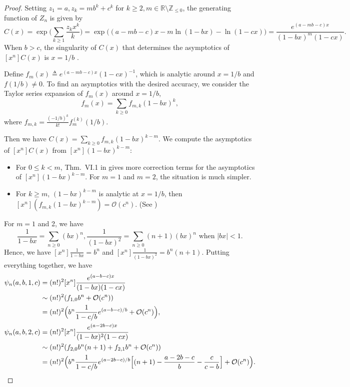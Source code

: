 \documentclass[conference]{IEEEtran}
\theoremstyle{plain}
\theoremstyle{definition}
\providecommand{\Z}{\mathbb {Z}}
\providecommand{\R}{\mathbb {R}}
\newcommand{\defeq}{\triangleq}
\begin{document}
 \begin{proof}
  Setting $z_1=a, z_k=mb^k+c^k$ for $k\geq 2, m\in \R\setminus\Z_{\leq 0} $, the generating function of $Z_n$ is given by
  \[
   C(x)=\exp\Biggl(\sum_{k\geq 1}\frac{z_kx^k}{k}\Biggr)
   =\exp\bigl((a-mb-c)x-m\ln(1-bx)-\ln(1-cx)\bigr)
   =\frac{e^{(a-mb-c)x}}{(1-bx)^m(1-cx)}.
  \]
  When $b>c$, the singularity of $C(x)$ that determines the asymptotics of
  $[x^n]C(x)$ is $x=1/b$ \cite{flajoletAnalyticCombinatorics2009}.

  Define $f_m(x)\defeq e^{(a-mb-c)x}(1-cx)^{-1}$, which is analytic around
  $x=1/b$ and $f(1/b)\neq 0$. To find an asymptotics with the desired accuracy,
  we consider the Taylor series expansion of $f_m(x)$ around $x=1/b$,
  \[f_m(x)=\sum_{k\geq 0}f_{m,k}(1-bx)^k,\]
  where $f_{m,k}=\frac{(-1/b)^k}{k!}f_m^{(k)}(1/b)$.

  Then we have $C(x)=\sum_{k\geq 0}f_{m,k}(1-bx)^{k-m}$. We compute the
  asymptotics of $[x^n]C(x)$ from $[x^n](1-bx)^{k-m}$:
  \begin{itemize}
   \item For $0\leq k < m$, Thm.~VI.1 in
   \cite{flajoletAnalyticCombinatorics2009} gives more correction terms for the
   asymptotics of $[x^n](1-bx)^{k-m}$. For $m=1$ and $m=2$, the situation is
   much simpler.
   \item For $k\geq m$, $(1-bx)^{k-m}$ is analytic at $x=1/b$, then
   $[x^n](f_{m,k}(1-bx)^{k-m})=\mathcal O(c^n)$. (See
   \cite[Thm.~IV.9\&10]{flajoletAnalyticCombinatorics2009})
  \end{itemize}
  For $m=1$ and 2, we have
  \[\frac{1}{1-bx}=\sum_{n\ge 0}(bx)^n,\frac{1}{(1-bx)^2}=\sum_{n\geq 0}(n+1)(bx)^n \text{ when }|bx|<1.\]
  Hence, we have $[x^n]\frac{1}{1-bx}=b^n$ and
  $[x^n]\frac{1}{(1-bx)^2}=b^n(n+1)$. Putting everything together, we have
  \begin{align*}
   \psi_n(a,b,1,c)
    & =(n!)^2[x^n]\frac{e^{(a-b-c)x}}{(1-bx)(1-cx)}                                                                                 \\
    & \sim(n!)^2(f_{1,0}b^n+\mathcal O(c^n))                                                                                        \\
    & = (n!)^2 \Big(b^n\frac{1}{1-c/b}e^{(a-b-c)/b}+\mathcal O(c^n)\Big),                                                           \\
   \psi_n(a,b,2,c)
    & =(n!)^2[x^n]\frac{e^{(a-2b-c)x}}{(1-bx)^2(1-cx)}                                                                              \\
    & \sim(n!)^2(f_{2,0}b^n(n+1)+f_{2,1}b^n+\mathcal O(c^n))                                                                        \\
    & = (n!)^2 \Big(b^n\frac{1}{1-c/b}e^{(a-2b-c)/b}\Big [(n+1)-\frac{a-2b-c}{b}-\frac{c}{c-b} \Big]+\mathcal O(c^n)\Big). \qedhere
  \end{align*}
 \end{proof}
\end{document}
